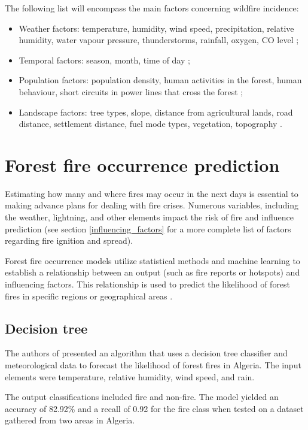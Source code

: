 The following list will encompass the main factors concerning wildfire incidence:
\begin{itemize}
    \item Weather factors: temperature, humidity, wind speed, precipitation, relative humidity, water vapour pressure, thunderstorms, rainfall, oxygen, CO level \cite{10085661, arif2021role, Sharma2020, f14020170};
    \item Temporal factors: season, month, time of day \cite{arif2021role};
    \item Population factors: population density, human activities in the forest, human behaviour, short circuits in power lines that cross the forest \cite{arif2021role};
    \item Landscape factors: tree types, slope, distance from agricultural lands, road distance, settlement distance, fuel mode types, vegetation, topography \cite{Novo2020MappingFF, arif2021role, bountzouklis2023predicting}.    
\end{itemize}



\section{Forest fire occurrence prediction}
Estimating how many and where fires may occur in the next days is essential to making advance plans for dealing with fire crises. Numerous variables, including the weather, lightning, and other elements impact the risk of fire and influence prediction (see section \ref{influencing_factors} for a more complete list of factors regarding fire ignition and spread). 

Forest fire occurrence models utilize statistical methods and machine learning to establish a relationship between an output (such as fire reports or hotspots) and influencing factors. This relationship is used to predict the likelihood of forest fires in specific regions or geographical areas \cite{jain2020review}.

\subsection{Decision tree}
The authors of \cite{abid2020predicting} presented an algorithm that uses a decision tree classifier and meteorological data to forecast the likelihood of forest fires in Algeria. The input elements were temperature, relative humidity, wind speed, and rain. 


The output classifications included fire and non-fire. The model yielded an accuracy of 82.92\% and a recall of 0.92 for the fire class when tested on a dataset gathered from two areas in Algeria.


